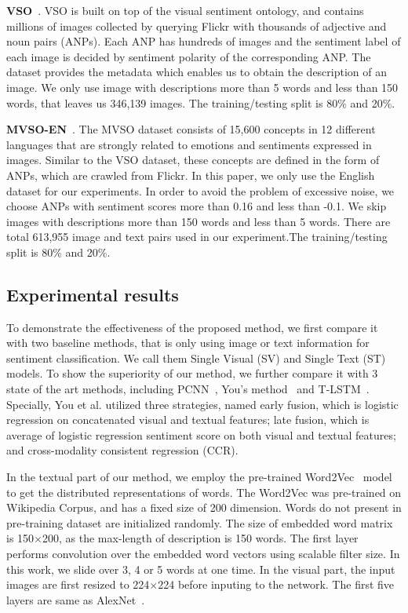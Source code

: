 \documentclass{article}
\begin{document}
\textbf{VSO}~\cite{borth2013large}. VSO is built on top of the visual sentiment ontology,  and contains millions of images collected by querying Flickr with thousands of adjective and noun pairs (ANPs). Each ANP has hundreds of images and the sentiment label of each image is decided by sentiment polarity of the corresponding ANP. The dataset provides the metadata which enables us to obtain the description of an image. We only use image with descriptions more than 5 words and less than 150 words, that leaves us 346,139 images. The training/testing split is 80\% and 20\%.

\textbf{MVSO-EN}~\cite{jou2015visual}. The MVSO dataset consists of 15,600 concepts in 12 \mbox{different} languages that are strongly related to emotions and sentiments expressed in images. Similar to the VSO dataset, these concepts are defined in the form of ANPs,  which are crawled from Flickr. In this paper, we only use the English dataset for our experiments. In order to avoid the problem of excessive noise,  we choose ANPs with sentiment scores more than 0.16 and less than -0.1. We skip images with descriptions more than 150 words and less than 5 \mbox{words}. There are total 613,955 image and text pairs used in our experiment.The training/testing split is 80\% and 20\%.





\vspace{-0.3cm}
  \subsection{Experimental results}
 \label{ssec:subhead}
To demonstrate the effectiveness of the proposed method, we first compare it with two baseline methods, that is only \mbox{using} image or text information for sentiment classification. We call them Single Visual (SV) and Single Text (ST) models. To show the superiority of our method, we further compare it with 3 state of the art methods, including PCNN~\cite{you2015robust}, You's method~\cite{you2016cross} and T-LSTM~\cite{you2016robust}. Specially, You et al. utilized three strategies, named early fusion, which is logistic regression on concatenated visual and textual features; late fusion, which is average of logistic regression sentiment {} score on both visual and textual features; and cross-modality consistent regression (CCR).


In the textual part of our method, we employ the pre-trained Word2Vec~\cite{mikolov2013distributed} model to get the distributed representations of words. The Word2Vec was pre-trained on Wikipedia Corpus, and has a fixed size of 200 dimension. Words do not present in pre-training dataset are initialized randomly. The size of embedded word matrix is 150$\times$200, as the max-length of description is 150 words. The first layer performs convolution over the embedded word vectors using scalable filter size. In this work,  we slide over 3, 4 or 5 words at one time.
In the visual part,  the input images are first resized to 224$\times$224 before inputing to the network. The first five layers are same as AlexNet~\cite{krizhevsky2012imagenet}.
\end{document}
